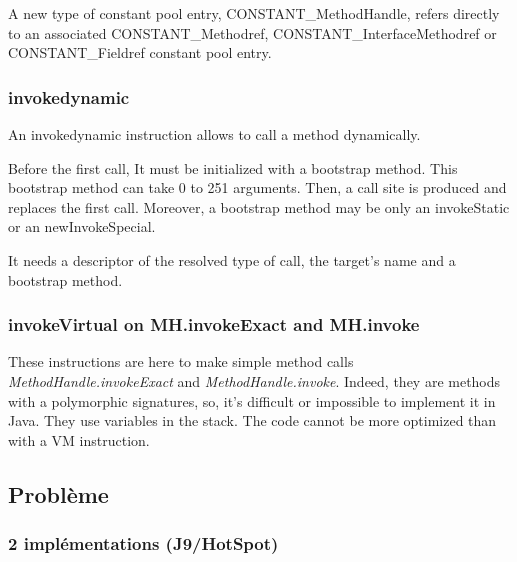 \documentclass{sigplanconf}
\begin{document}
        A new type of constant pool entry, CONSTANT\_MethodHandle,
        refers directly to an associated CONSTANT\_Methodref,
        CONSTANT\_InterfaceMethodref or CONSTANT\_Fieldref constant pool entry.

      \subsubsection{invokedynamic}
        An invokedynamic instruction allows to call a method dynamically.

        Before the first call, It must be initialized with a bootstrap method.
        This bootstrap method can take 0 to 251 arguments.
        Then, a call site is produced and replaces the first call.
        Moreover, a bootstrap method may be only an invokeStatic or an newInvokeSpecial.

        It needs a descriptor of the resolved type of call, the target's name and a bootstrap method.

      \subsubsection{invokeVirtual on MH.invokeExact and MH.invoke}
        These instructions are here to make simple method calls\\
        \mbox{\textit{MethodHandle.invokeExact}} and \mbox{\textit{MethodHandle.invoke}}.
        Indeed, they are methods with a polymorphic signatures,
        so, it's difficult or impossible to implement it in Java.
        They use variables in the stack.
        The code cannot be more optimized than with a VM instruction.

  \subsection{Probl\`eme}

    \subsubsection{2 impl\'ementations (J9/HotSpot)}
\end{document}
